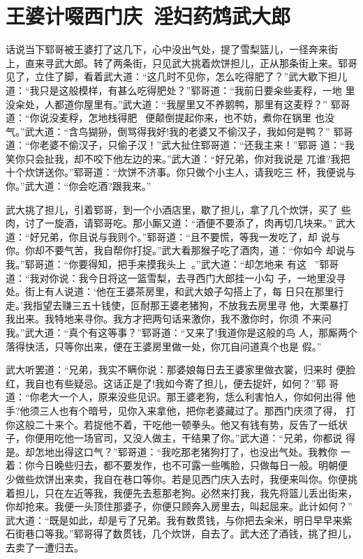 \chapter{王婆计啜西门庆~淫妇药鸩武大郎}

话说当下郓哥被王婆打了这几下，心中没出气处，提了雪梨篮儿，一径奔来街
上，直来寻武大郎。转了两条街，只见武大挑着炊饼担儿，正从那条街上来。郓哥
见了，立住了脚，看着武大道：“这几时不见你，怎么吃得肥了？”武大歇下担儿
道：“我只是这般模样，有甚么吃得肥处？”郓哥道：“我前日要籴些麦稃，一地
里没籴处，人都道你屋里有。”武大道：“我屋里又不养鹅鸭，那里有这麦稃？”
郓哥道：“你说没麦稃，怎地栈得肥，便颠倒提起你来，也不妨，煮你在锅里
也没气。”武大道：“含鸟猢狲，倒骂得我好!我的老婆又不偷汉子，我如何是鸭？”
郓哥道：“你老婆不偷汉子，只偷子汉！”武大扯住郓哥道：“还我主来！”郓哥
道：“我笑你只会扯我，却不咬下他左边的来。”武大道：“好兄弟，你对我说是
兀谁?我把十个炊饼送你。”郓哥道：“炊饼不济事。你只做个小主人，请我吃三
杯，我便说与你。”武大道：“你会吃酒?跟我来。”

武大挑了担儿，引着郓哥，到一个小酒店里，歇了担儿，拿了几个炊饼，买了
些肉，讨了一旋酒，请郓哥吃。那小厮又道：“酒便不要添了，肉再切几块来。”
武大道：“好兄弟，你且说与我则个。”郓哥道：“且不要慌，等我一发吃了，却
说与你。你却不要气苦，我自帮你打捉。”武大看那猴子吃了酒肉，道：“你如今
却说与我。”郓哥道：“你要得知，把手来摸我头上。”武大道：“却怎地来
有这？”郓哥道：“我对你说：我今日将这一篮雪梨，去寻西门大郎挂一小勾
子，一地里没寻处。街上有人说道：‘他在王婆茶房里，和武大娘子勾搭上了，每
日只在那里行走。’我指望去赚三五十钱使，叵耐那王婆老猪狗，不放我去房里寻
他，大栗暴打我出来。我特地来寻你。我方才把两句话来激你，我不激你时，你须
不来问我。”武大道：“真个有这等事？”郓哥道：“又来了!我道你是这般的鸟
人，那厮两个落得快活，只等你出来，便在王婆房里做一处，你兀自问道真个也是
假。”

武大听罢道：“兄弟，我实不瞒你说：那婆娘每日去王婆家里做衣裳，归来时
便脸红，我自也有些疑忌。这话正是了!我如今寄了担儿，便去捉奸，如何？”郓
哥道：“你老大一个人，原来没些见识。那王婆老狗，恁么利害怕人，你如何出得
他手?他须三人也有个暗号，见你入来拿他，把你老婆藏过了。那西门庆须了得，
打你这般二十来个。若捉他不着，干吃他一顿拳头。他又有钱有势，反告了一纸状
子，你便用吃他一场官司，又没人做主，干结果了你。”武大道：“兄弟，你都说
得是。却怎地出得这口气？”郓哥道：“我吃那老猪狗打了，也没出气处。我教你
一着：你今日晚些归去，都不要发作，也不可露一些嘴脸，只做每日一般。明朝便
少做些炊饼出来卖，我自在巷口等你。若是见西门庆入去时，我便来叫你。你便挑
着担儿，只在左近等我，我便先去惹那老狗。必然来打我，我先将篮儿丢出街来，
你却抢来。我便一头顶住那婆子，你便只顾奔入房里去，叫起屈来。此计如何？”
武大道：“既是如此，却是亏了兄弟。我有数贯钱，与你把去籴米，明日早早来紫
石街巷口等我。”郓哥得了数贯钱，几个炊饼，自去了。武大还了酒钱，挑了担儿，
去卖了一遭归去。

